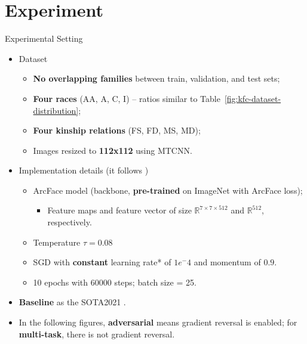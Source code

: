 \documentclass[aspectratio=169,xcolor=dvipsnames]{beamer}
\begin{document}
\section{Experiment}

\begin{frame}{Experimental Setting}
    \begin{itemize}
        \item Dataset
        \begin{itemize}
            \item \textbf{No overlapping families} between train, validation, and test sets;
            \item \textbf{Four races} (AA, A, C, I) -- ratios similar to Table~\ref{fig:kfc-dataset-distribution}; 
            \item \textbf{Four kinship relations} (FS, FD, MS, MD); 
            \item Images resized to \textbf{112x112} using MTCNN.
        \end{itemize}
        \item Implementation details (it follows \cite{R46})
        \begin{itemize}
            \item ArcFace model (backbone, \textbf{pre-trained} on ImageNet with ArcFace loss);
            \begin{itemize}
                \item Feature maps and feature vector of size $\mathbb{R}^{7\times7\times512}$ and $\mathbb{R}^{512}$, respectively.
            \end{itemize}
            \item Temperature $\tau = 0.08$ 
            \item SGD with \textbf{constant} learning rate* of $1e^-4$ and momentum of $0.9$.
            \item 10 epochs with 60000 steps; batch size = 25.
        \end{itemize}
        \item \textbf{Baseline} as the SOTA2021 \cite{R46}.
        \item In the following figures, \textbf{adversarial} means gradient reversal is enabled; for \textbf{multi-task}, there is not gradient reversal.
    \end{itemize}
\end{frame}
\end{document}
